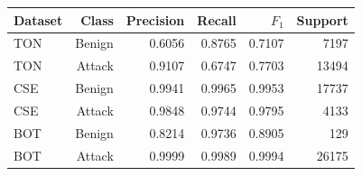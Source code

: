 \begin{tabular}{lrrrrr}
\toprule
Dataset & Class & Precision & Recall & $F_1$ & Support \\
\midrule
TON & Benign & 0.6056 & 0.8765 & 0.7107 & 7197 \\
TON & Attack & 0.9107 & 0.6747 & 0.7703 & 13494 \\
CSE & Benign & 0.9941 & 0.9965 & 0.9953 & 17737 \\
CSE & Attack & 0.9848 & 0.9744 & 0.9795 & 4133 \\
BOT & Benign & 0.8214 & 0.9736 & 0.8905 & 129 \\
BOT & Attack & 0.9999 & 0.9989 & 0.9994 & 26175 \\
\bottomrule
\end{tabular}
